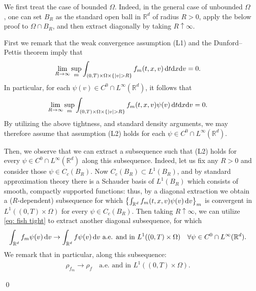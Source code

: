 \documentclass[10pt, reqno]{amsart}
\theoremstyle{plain}
\theoremstyle{definition}
\theoremstyle{remark}
\renewenvironment{proof}[1][\proofname]{\noindent{\scshape #1.\quad}}{\qed}
\numberwithin{equation}{section}
\newcommand{\R}{\mathbb{R}}
\newcommand{\dx}{\textnormal{d}x}
\newcommand{\dv}{\textnormal{d}v}
\newcommand{\dt}{\textnormal{d}t}
\newcommand{\intr}{\int_{\R^d}}
\begin{document}
\begin{proof}[Proof of Lemma \ref{lem: key compactness}]
We first treat the case of bounded $\Omega$. Indeed, in the general case of unbounded $\Omega$, one can set $B_R$ as the standard open ball in $\R^d$ of radius $R>0$, apply the below proof to $\Omega\cap B_R$, and then extract diagonally by taking $R\uparrow \infty$.
    
    First we remark that the weak convergence assumption (L1) and the Dunford--Pettis theorem imply that
    \begin{align*}
        \lim_{R\to\infty} \sup_m \int_{(0,T)\times\Omega\times \{|v|>R\}} f_m(t,x,v)\,\dt\dx\dv = 0 .
    \end{align*}
    In particular, for each $\psi(v)\in C^0\cap L^\infty(\R^d)$, it follows that
    \begin{align} \label{eq: fish tight}
        \lim_{R\to\infty} \sup_m \int_{(0,T)\times\Omega\times \{|v|>R\}} f_m(t,x,v) \psi(v)\,\dt\dx\dv = 0 .
    \end{align}
    By utilizing the above tightness, and standard density arguments, we may therefore assume that assumption (L2) holds for each $\psi \in C^0\cap L^\infty (\R^d)$.
    
    Then, we observe that we can extract a subsequence such that (L2) holds for every $\psi\in C^0\cap L^\infty(\R^d)$ along this subsequence. Indeed, let us fix any $R>0$ and consider those $\psi\in C_c(B_R)$. Now $C_c(B_R) \subset L^1(B_R)$, and by standard approximation theory there is a Schauder basis of $L^1(B_R)$ which consists of smooth, compactly supported functions: thus, by a diagonal extraction we obtain a ($R$-dependent) subsequence for which $\left\{\intr f_m(t,x,v) \psi(v)\,\dv\right\}_m$ is convergent in $L^1((0,T)\times\Omega)$ for every $\psi \in C_c(B_R)$. Then taking $R\uparrow \infty$, we can utilize \eqref{eq: fish tight} to extract another diagonal subsequence, for which
    \begin{align} \label{eq: fish velavg}
        \int_{\R^d} f_m \psi(v) \,\dv \to \int_{\R^d} f \psi(v) \,\dv \text{ a.e. and in $L^1((0,T)\times\Omega)$} \quad \forall \psi\in C^0 \cap L^\infty(\R^d).
    \end{align}
    We remark that in particular, along this subsequence:
    \begin{align}\label{eq: fish: rho}
        \rho_{f_m} \to \rho_f \quad \text{a.e. and in }L^1((0,T)\times\Omega).
    \end{align}
    

\end{proof}
\end{document}
